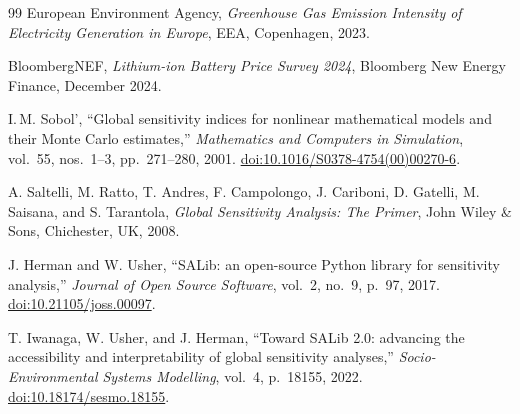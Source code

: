 \documentclass[11pt,a4paper]{article}
\begin{document}
\begin{thebibliography}{99}
European Environment Agency,
\emph{Greenhouse Gas Emission Intensity of Electricity Generation in Europe},
EEA, Copenhagen, 2023.

BloombergNEF,
\emph{Lithium-ion Battery Price Survey 2024},
Bloomberg New Energy Finance, December 2024.

I.\,M. Sobol',
``Global sensitivity indices for nonlinear mathematical models and their Monte Carlo estimates,''
\emph{Mathematics and Computers in Simulation}, vol.~55, nos.~1--3, pp.~271--280, 2001.
\href{https://doi.org/10.1016/S0378-4754(00)00270-6}{doi:10.1016/S0378-4754(00)00270-6}.

A. Saltelli, M. Ratto, T. Andres, F. Campolongo, J. Cariboni, D. Gatelli, M. Saisana, and S. Tarantola,
\emph{Global Sensitivity Analysis: The Primer},
John Wiley \& Sons, Chichester, UK, 2008.

J. Herman and W. Usher,
``SALib: an open-source Python library for sensitivity analysis,''
\emph{Journal of Open Source Software}, vol.~2, no.~9, p.~97, 2017.
\href{https://doi.org/10.21105/joss.00097}{doi:10.21105/joss.00097}.

T. Iwanaga, W. Usher, and J. Herman,
``Toward SALib 2.0: advancing the accessibility and interpretability of global sensitivity analyses,''
\emph{Socio-Environmental Systems Modelling}, vol.~4, p.~18155, 2022.
\href{https://doi.org/10.18174/sesmo.18155}{doi:10.18174/sesmo.18155}.

\end{thebibliography}
\end{document}

